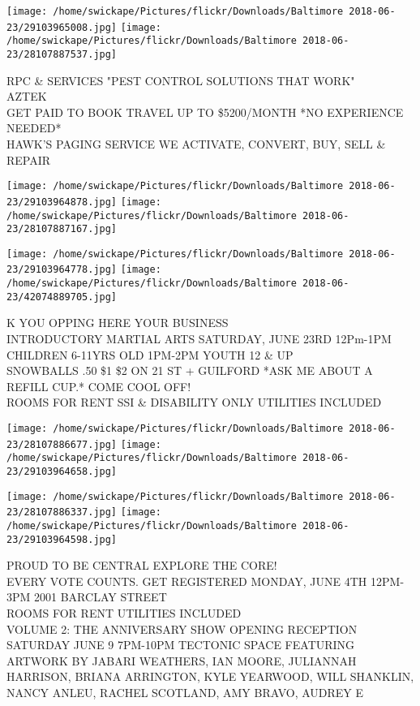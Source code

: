 \documentclass[10pt,letterpaper]{article}
\begin{document}
\texttt{[image: /home/swickape/Pictures/flickr/Downloads/Baltimore 2018-06-23/29103965008.jpg]}
\texttt{[image: /home/swickape/Pictures/flickr/Downloads/Baltimore 2018-06-23/28107887537.jpg]}

RPC \& SERVICES "PEST CONTROL SOLUTIONS THAT WORK"\\
AZTEK\\
GET PAID TO BOOK TRAVEL UP TO \$5200/MONTH *NO EXPERIENCE NEEDED*\\
HAWK'S PAGING SERVICE WE ACTIVATE, CONVERT, BUY, SELL \& REPAIR\\
\pagebreak

\texttt{[image: /home/swickape/Pictures/flickr/Downloads/Baltimore 2018-06-23/29103964878.jpg]}
\texttt{[image: /home/swickape/Pictures/flickr/Downloads/Baltimore 2018-06-23/28107887167.jpg]}

\texttt{[image: /home/swickape/Pictures/flickr/Downloads/Baltimore 2018-06-23/29103964778.jpg]}
\texttt{[image: /home/swickape/Pictures/flickr/Downloads/Baltimore 2018-06-23/42074889705.jpg]}

K YOU OPPING HERE YOUR BUSINESS\\
INTRODUCTORY MARTIAL ARTS SATURDAY, JUNE 23RD 12Pm{-}1PM CHILDREN 6{-}11YRS OLD 1PM{-}2PM YOUTH 12 \& UP\\
SNOWBALLS .50 \$1 \$2 ON 21 ST + GUILFORD *ASK ME ABOUT A REFILL CUP.* COME COOL OFF!\\
ROOMS FOR RENT SSI \& DISABILITY ONLY UTILITIES INCLUDED\\
\pagebreak

\texttt{[image: /home/swickape/Pictures/flickr/Downloads/Baltimore 2018-06-23/28107886677.jpg]}
\texttt{[image: /home/swickape/Pictures/flickr/Downloads/Baltimore 2018-06-23/29103964658.jpg]}

\texttt{[image: /home/swickape/Pictures/flickr/Downloads/Baltimore 2018-06-23/28107886337.jpg]}
\texttt{[image: /home/swickape/Pictures/flickr/Downloads/Baltimore 2018-06-23/29103964598.jpg]}

PROUD TO BE CENTRAL EXPLORE THE CORE!\\
EVERY VOTE COUNTS.  GET REGISTERED MONDAY, JUNE 4TH 12PM{-}3PM 2001 BARCLAY STREET\\
ROOMS FOR RENT  UTILITIES INCLUDED\\
VOLUME 2: THE ANNIVERSARY SHOW OPENING RECEPTION SATURDAY JUNE 9 7PM{-}10PM TECTONIC SPACE FEATURING ARTWORK BY JABARI WEATHERS, IAN MOORE, JULIANNAH HARRISON, BRIANA ARRINGTON, KYLE YEARWOOD, WILL SHANKLIN, NANCY ANLEU, RACHEL SCOTLAND, AMY BRAVO, AUDREY E\\
\pagebreak
\end{document}
